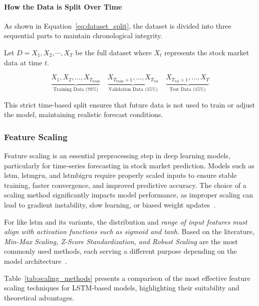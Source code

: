 \paragraph{How the Data is Split Over Time}
As shown in Equation~\ref{eq:dataset_split}, the dataset is divided into three sequential parts to maintain chronological integrity.

Let $D={X_1,X_2,\cdots,X_T}$ be the full dataset where $X_t$ represents the stock market data at time $t$. 

\begin{equation}
\label{eq:dataset_split}
    \underbrace{X_1, X_2, \dots, X_{T_{\text{train}}}}_{\text{Training Data (70\%)}} \quad
    \underbrace{X_{T_{\text{train}}+1}, \dots, X_{T_{\text{val}}}}_{\text{Validation Data (15\%)}} \quad
    \underbrace{X_{T_{\text{val}}+1}, \dots, X_T}_{\text{Test Data (15\%)}} 
\end{equation}

This strict time-based split ensures that future data is not used to train or adjust the model, maintaining realistic forecast conditions\parencite{guo2024LSTMStock}.

\subsubsection{Feature Scaling}

Feature scaling is an essential preprocessing step in deep learning models, particularly for
time-series forecasting in stock market prediction. Models such as \acrshort{lstm}, 
\acrshort{lstmgru}, and \acrshort{lstmbigru} require properly scaled inputs to ensure stable
training, faster convergence, and improved predictive accuracy. The choice of a scaling
method significantly impacts model performance, as improper scaling can lead to gradient
instability, slow learning, or biased weight updates~\cite{chang2024StockPrediction}.

For  like \acrshort{lstm} and its variants, the distribution 
and \emph{range of input features must align with activation functions such as sigmoid and tanh}. Based on the literature, 
\emph{Min-Max Scaling, Z-Score Standardization, and Robust Scaling} are the most
commonly used methods, each serving a different purpose depending on the model 
architecture~\cite{balasubramanian2023SystematicSurvey}.

Table~\ref{tab:scaling_methods} presents a comparison of the most effective feature scaling techniques for LSTM-based models, highlighting their suitability and theoretical advantages.

